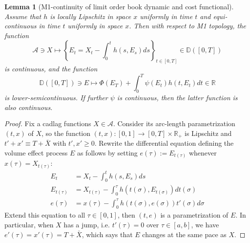 \documentclass[openany,oneside]{article}
\newtheorem{lem}[thm]{Lemma}
\theoremstyle{definition}
\theoremstyle{remark}
\begin{document}
\begin{lem}[M1-continuity of limit order book dynamic and cost functional]
Assume that $h$ is locally Lipschitz in space $x$ uniformly in time $t$ and equi-continuous in time $t$ uniformly in space $x$. Then with respect to M1 topology, the function
$$\mathcal{A} \ni X \mapsto \left\{ E_t = X_t - \int_0^t h(s,E_s) ds \right\}_{t\in[0,T]} \in \mathbb{D}([0,T])$$
is continuous, and the function
$$\mathbb{D}([0,T]) \ni E \mapsto \Phi(E_T) + \int_0^T \psi(E_t) h(t,E_t) dt \in \mathbb{R}$$
is lower-semicontinuous. If further $\psi$ is continuous, then the latter function is also continuous. 
\end{lem}
\begin{proof}
Fix a cadlag functions $X\in \mathcal{A}$. Consider its arc-length parametrization $(t,x)$ of $X$, so the function $(t,x):[0,1] \to [0,T]\times \mathbb{R}_+$ is Lipschitz and $t'+x' \equiv T+\bar{X}$ with $t',x'\ge 0$. Rewrite the differential equation defining the volume effect process $E$ as follows by setting $e(\tau) := E_{t(\tau)}$ whenever $x(\tau)=X_{t(\tau)}$:
\begin{align*}
E_t &= X_t - \int_0^t h(s,E_s) ds \\
E_{t(\tau)} &= X_{t(\tau)} - \int_0^{\tau} h(t(\sigma),E_{t(\sigma)}) d t(\sigma) \\
e(\tau) &= x(\tau) - \int_0^{\tau} h(t(\sigma),e(\sigma)) t'(\sigma) d\sigma
\end{align*}
Extend this equation to all $\tau\in[0,1]$, then $(t,e)$ is a parametrization of $E$. In particular, when $X$ has a jump, i.e. $t'(\tau)=0$ over $\tau\in[a,b]$, we have $e'(\tau)=x'(\tau)=T+\bar{X}$, which says that $E$ changes at the same pace as $X$.


\end{proof}
\end{document}
